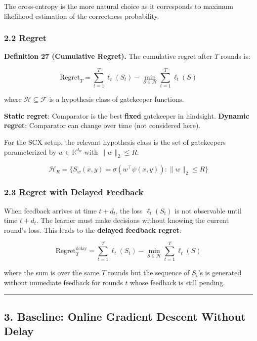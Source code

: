 \documentclass[
  12pt,
]{article}
\begin{document}
The cross-entropy is the more natural choice as it corresponds to
maximum likelihood estimation of the correctness probability.

\subsubsection{2.2 Regret}\label{regret}

\textbf{Definition 27 (Cumulative Regret).} The cumulative regret after
\(T\) rounds is:

\[\text{Regret}_T = \sum_{t=1}^T \ell_t(S_t) - \min_{S \in \mathcal{H}} \sum_{t=1}^T \ell_t(S)\]

where \(\mathcal{H} \subseteq \mathcal{F}\) is a hypothesis class of
gatekeeper functions.

\textbf{Static regret}: Comparator is the best \textbf{fixed} gatekeeper
in hindsight. \textbf{Dynamic regret}: Comparator can change over time
(not considered here).

For the SCX setup, the relevant hypothesis class is the set of
gatekeepers parameterized by \(w \in \mathbb{R}^{d_w}\) with
\(\|w\|_2 \leq R\):

\[\mathcal{H}_R = \bigl\{ S_w(x,y) = \sigma(w^\top \psi(x,y)) : \|w\|_2 \leq R \bigr\}\]

\subsubsection{2.3 Regret with Delayed
Feedback}\label{regret-with-delayed-feedback}

When feedback arrives at time \(t + d_t\), the loss \(\ell_t(S_t)\) is
not observable until time \(t + d_t\). The learner must make decisions
without knowing the current round's loss. This leads to the
\textbf{delayed feedback regret}:

\[\text{Regret}_T^{\text{delay}} = \sum_{t=1}^T \ell_t(S_t) - \min_{S \in \mathcal{H}} \sum_{t=1}^T \ell_t(S)\]

where the sum is over the same \(T\) rounds but the sequence of
\(S_t\)'s is generated without immediate feedback for rounds \(t\) whose
feedback is still pending.

\begin{center}\rule{0.5\linewidth}{0.5pt}\end{center}

\subsection{3. Baseline: Online Gradient Descent Without
Delay}\label{baseline-online-gradient-descent-without-delay}
\end{document}

